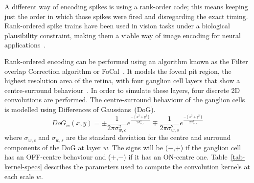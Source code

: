 A different way of encoding spikes is using a rank-order code; this means
keeping just the order in which those spikes were fired and disregarding the exact timing. Rank-ordered spike trains have been used in vision tasks under a biological plausibility constraint, making them a viable way of image encoding for neural applications~\citep{van2001rate,sen2009evaluating,masmoudi2010novel}.

Rank-ordered encoding can be performed using an algorithm known as the
{Filter overlap Correction algorithm} or FoCal~\citep{sen2009evaluating}. It models the foveal pit region, the highest resolution area of the retina, with four ganglion cell layers that show a centre-surround behaviour~\citep{kolb2003retina}. In order to simulate these layers, four discrete 2D convolutions are performed. The centre-surround behaviour of the ganglion cells is modelled using Differences of Gaussians~(DoG). 
\begin{equation}
\label{eq-dog}
DoG_w(x,y) = \pm\frac{1}{2\pi\sigma_{w,c}^2}e^{\frac{-(x^2 + y^2)}{2\sigma_{w,c}^2}}
\mp\frac{1}{2\pi\sigma_{w,s}^2}e^{\frac{-(x^2 + y^2)}{2\sigma_{w,s}^2}}
\end{equation}
where $\sigma_{w,c}$ and $\sigma_{w,s}$ are the standard deviation for the 
centre and surround components of the DoG at layer $w$. The signs 
will be ($-$,$+$) if the ganglion cell has an OFF-centre behaviour and 
($+$,$-$) if it has an ON-centre one. Table~\ref{tab-kernel-specs} 
describes the parameters used to compute the convolution kernels at each 
scale $w$.


